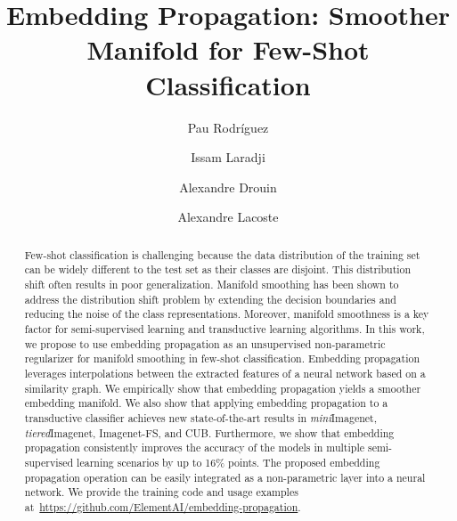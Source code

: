 \documentclass[runningheads]{llncs}
\begin{document}
\pagestyle{headings}
\mainmatter
\def\ECCVSubNumber{5313}  

\title{Embedding Propagation: Smoother Manifold for Few-Shot Classification} 

\begin{comment}
\titlerunning{ECCV-20 submission ID \ECCVSubNumber} 
\authorrunning{ECCV-20 submission ID \ECCVSubNumber} 
\author{Anonymous ECCV submission}
\institute{Paper ID \ECCVSubNumber}
\end{comment}


\author{Pau Rodr\'{i}guez \and
Issam Laradji \and
Alexandre Drouin \and
Alexandre Lacoste
}
\maketitle

\begin{abstract}
Few-shot classification is challenging because the data distribution of the training set can be widely different to the test set as their classes are disjoint. This distribution shift often results in poor generalization. Manifold smoothing has been shown to address the distribution shift problem by extending the decision boundaries and reducing the noise of the class representations. Moreover, manifold smoothness is a key factor for semi-supervised learning and transductive learning algorithms. In this work, we propose to use embedding propagation as an unsupervised non-parametric regularizer for manifold smoothing in few-shot classification. Embedding propagation leverages interpolations between the extracted features of a neural network based on a similarity graph. We empirically show that embedding propagation yields a smoother embedding manifold. We also show that applying embedding propagation to a transductive classifier achieves new state-of-the-art results in \textit{mini}Imagenet, \textit{tiered}Imagenet, Imagenet-FS, and CUB. Furthermore, we show that embedding propagation consistently improves the accuracy of the models in multiple semi-supervised learning scenarios by up to 16\% points. The proposed embedding propagation operation can be easily integrated as a non-parametric layer into a neural network. We provide the training code and usage examples at~\url{https://github.com/ElementAI/embedding-propagation}.

\end{abstract}
\end{document}
